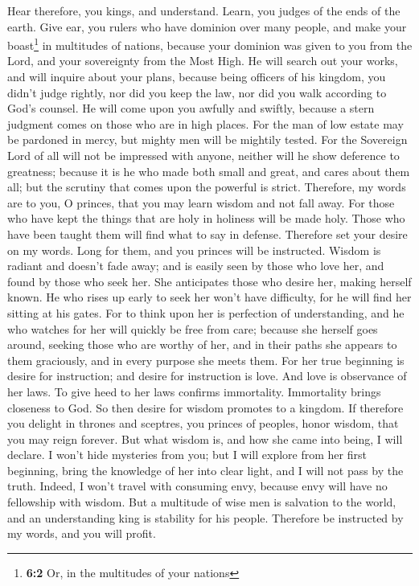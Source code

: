  Hear therefore, you kings, and understand. Learn, you
judges of the ends of the earth.  Give ear, you rulers who
have dominion over many people, and make your boast\footnote{\textbf{6:2}
  Or, in the multitudes of your nations} in multitudes of nations,
 because your dominion was given to you from the Lord, and
your sovereignty from the Most High. He will search out your works, and
will inquire about your plans,  because being officers of
his kingdom, you didn't judge rightly, nor did you keep the law, nor did
you walk according to God's counsel.  He will come upon
you awfully and swiftly, because a stern judgment comes on those who are
in high places.  For the man of low estate may be pardoned
in mercy, but mighty men will be mightily tested.  For the
Sovereign Lord of all will not be impressed with anyone, neither will he
show deference to greatness; because it is he who made both small and
great, and cares about them all;  but the scrutiny that
comes upon the powerful is strict.  Therefore, my words
are to you, O princes, that you may learn wisdom and not fall away.
 For those who have kept the things that are holy in
holiness will be made holy. Those who have been taught them will find
what to say in defense.  Therefore set your desire on my
words. Long for them, and you princes will be instructed.
 Wisdom is radiant and doesn't fade away; and is easily
seen by those who love her, and found by those who seek her.
 She anticipates those who desire her, making herself
known.  He who rises up early to seek her won't have
difficulty, for he will find her sitting at his gates. 
For to think upon her is perfection of understanding, and he who watches
for her will quickly be free from care;  because she
herself goes around, seeking those who are worthy of her, and in their
paths she appears to them graciously, and in every purpose she meets
them.  For her true beginning is desire for instruction;
and desire for instruction is love.  And love is
observance of her laws. To give heed to her laws confirms immortality.
 Immortality brings closeness to God.  So
then desire for wisdom promotes to a kingdom.  If
therefore you delight in thrones and sceptres, you princes of peoples,
honor wisdom, that you may reign forever.  But what
wisdom is, and how she came into being, I will declare. I won't hide
mysteries from you; but I will explore from her first beginning, bring
the knowledge of her into clear light, and I will not pass by the truth.
 Indeed, I won't travel with consuming envy, because envy
will have no fellowship with wisdom.  But a multitude of
wise men is salvation to the world, and an understanding king is
stability for his people.  Therefore be instructed by my
words, and you will profit.

